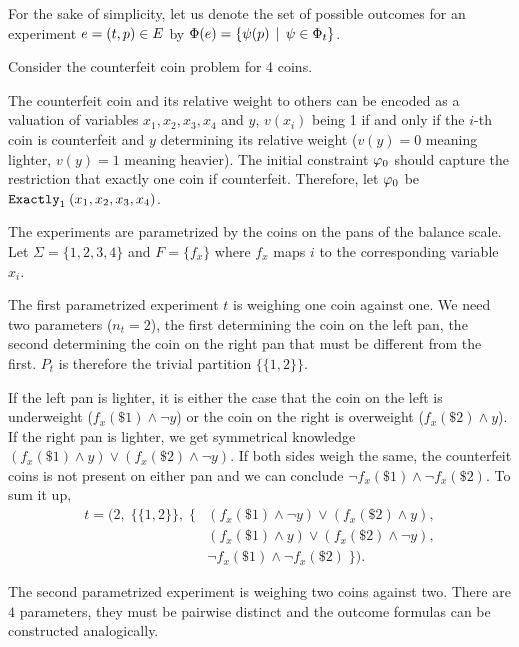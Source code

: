 For the sake of simplicity, let us denote the set of possible outcomes for
  an experiment $e = (t, p) \in E$ by
  $\Phi(e) = \{ \psi(p) \:\:|\:\: \psi\in\Phi_t\}$.

\begin{example} \label{ex:run1}
Consider the counterfeit coin problem for 4 coins.

The counterfeit coin and its relative weight to others can be encoded
  as a valuation of variables $x_1, x_2, x_3, x_4$ and $y$,
  $v(x_i)$ being 1 if and only if the $i$-th coin is counterfeit and
  $y$ determining its relative weight
  ($v(y) = 0$ meaning lighter, $v(y) = 1$ meaning heavier).
The initial constraint $\varphi_0$ should capture the restriction that exactly one
  coin if counterfeit.
Therefore, let $\varphi_0$ be $\mathtt{Exactly}_{1}\:(x_1, x_2, x_3, x_4)$.

The experiments are parametrized by the coins on the pans of the balance scale.
Let $\Sigma = \{1, 2, 3, 4\}$ and $F = \{ f_x \}$ where $f_x$
maps $i$ to the corresponding variable $x_i$.

The first parametrized experiment $t$ is weighing one coin against one.
We need two parameters ($n_t = 2$),
  the first determining the coin on the left pan,
  the second determining the coin on the right pan that must be different
  from the first.
$P_t$ is therefore the trivial partition $\{\{1, 2\}\}$.

If the left pan is lighter, it is either the case that the
  coin on the left is underweight ($f_x(\$1) \wedge \neg y$)
  or the coin on the right is overweight ($f_x(\$2) \wedge y$).
If the right pan is lighter, we get symmetrical knowledge
  $(f_x(\$1)\wedge y) \vee (f_x(\$2)\wedge\neg y)$.
If both sides weigh the same, the counterfeit coins is not present on either pan
  and we can conclude $\neg f_x(\$1) \wedge \neg f_x(\$2)$.
To sum it up,
\begin{align*}
  t = \big(2,\; \big\{\{1,2\}\big\},\; \big\{ &
    (f_x(\$1)\wedge \neg y) \vee (f_x(\$2)\wedge y), \\
    & (f_x(\$1)\wedge y) \vee (f_x(\$2)\wedge\neg y), \\
    & \neg f_x(\$1) \wedge \neg f_x(\$2) \;\big\}\big).
\end{align*}

The second parametrized experiment is weighing two coins against two.
There are $4$ parameters, they must be pairwise distinct and the outcome
  formulas can be constructed analogically. \eqed
\end{example}


